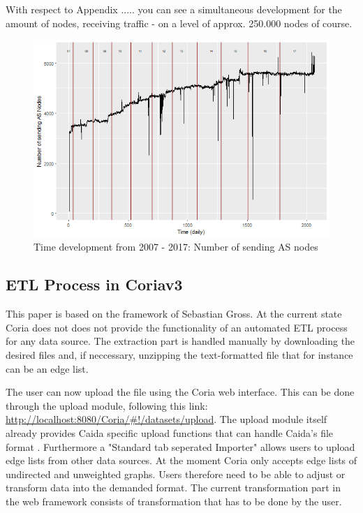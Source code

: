 \documentclass[conference, 11pt]{IEEEtran}
\begin{document}
With respect to Appendix .....  you can see a simultaneous development for the amount of nodes, receiving traffic - on a level of approx. 250.000 nodes of course. 

\vspace{0.5cm}
\begin{figure}[htbp]
\centerline{\includegraphics[scale=0.4]{Graphics/ASFromAll.png}}
\caption{Time development from 2007 - 2017: Number of sending AS nodes}
\label{fig}
\end{figure}
\vspace{0.5cm}

\subsection{ETL Process in Coriav3}



This paper is based on the framework of Sebastian Gross\cite{Coria3}. At the current state Coria does not does not provide the functionality of an automated ETL process for any data source. The extraction part is handled manually by downloading the desired files and, if neccessary, unzipping the text-formatted file that for instance can be an edge list. \linebreak


The user can now upload the file using the Coria web interface. This can be done through the upload module, following this link: \url{http://localhost:8080/Coria/#!/datasets/upload}. The upload module itself already provides Caida specific upload functions that can handle Caida's file format \cite{Coria3}. Furthermore a "Standard tab seperated Importer" allows users to upload edge lists from other data sources. At the moment Coria only accepts edge lists of undirected and unweighted graphs. Users therefore need to be able to adjust or transform data into the demanded format. The current transformation part in the web framework consists of transformation that has to be done by the user.\linebreak
\end{document}

